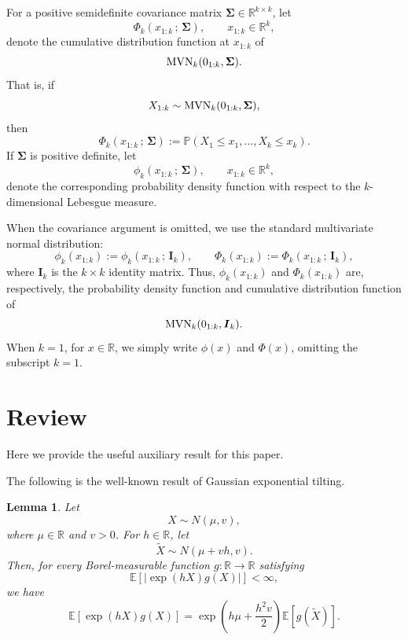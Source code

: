 \documentclass[11pt,authoryear]{elsarticle}
\def\Real{\mathbb{R}}
\def\P#1{{\mathbb{P}}\left(#1\right)}
\def\E#1{{\mathbb E}\left[#1\right]}
\newtheorem{lemma}{Lemma}
\theoremstyle{nopunct}
\numberwithin{equation}{section}
\begin{document}
For a positive semidefinite covariance matrix
\(\boldsymbol\Sigma\in\Real^{k\times k}\), let
\[
\Phi_k(x_{1:k}\,;\,\boldsymbol\Sigma),
\qquad
x_{1:k}\in\Real^k,
\]
denote the cumulative distribution function at \(x_{1:k}\) of
\[
{\rm MVN}_k(0_{1:k},\boldsymbol\Sigma).
\]
That is, if
\[
X_{1:k}
\sim
{\rm MVN}_k(0_{1:k},\boldsymbol\Sigma),
\]
then
\[
\Phi_k(x_{1:k}\,;\,\boldsymbol\Sigma)
:=
\P{
X_1\le x_1,\ldots,X_k\le x_k
}.
\]
If \(\boldsymbol\Sigma\) is positive definite, let
\[
\phi_k(x_{1:k}\,;\,\boldsymbol\Sigma),
\qquad
x_{1:k}\in\Real^k,
\]
denote the corresponding probability density function with respect to
the \(k\)-dimensional Lebesgue measure. 

When the covariance argument is omitted, we use the standard
multivariate normal distribution:
\[
\phi_k(x_{1:k})
:=
\phi_k(x_{1:k}\,;\,\boldsymbol I_k),
\qquad
\Phi_k(x_{1:k})
:=
\Phi_k(x_{1:k}\,;\,\boldsymbol I_k),
\]
where \(\boldsymbol I_k\) is the \(k\times k\) identity matrix. Thus,
\(\phi_k(x_{1:k})\) and \(\Phi_k(x_{1:k})\) are, respectively, the
probability density function and cumulative distribution function of
\[
{\rm MVN}_k(0_{1:k},\boldsymbol I_k).
\]
When \(k=1\), for \(x\in\Real\), we simply write
\(\phi(x)\) and \(\Phi(x)\), omitting the subscript \(k=1\).

















\section{Review}
Here we provide the useful auxiliary result for this paper.

The following is the well-known result of Gaussian exponential tilting.
\begin{lemma}
\label{lem.4}
Let
\[
X\sim N(\mu,v),
\]
where \(\mu\in\Real\) and \(v>0\). For \(h\in\Real\), let
\[
\widetilde X
\sim
N(\mu+vh,v).
\]
Then, for every Borel-measurable function
\(g:\Real\to\Real\) satisfying
\[
\E{
\left|
\exp(hX)g(X)
\right|
}
<\infty,
\]
we have
\[
\E{
\exp(hX)g(X)
}
=
\exp\left(
h\mu+\frac{h^2v}{2}
\right)
\E{
g(\widetilde X)
}.
\]
\end{lemma}
\end{document}
